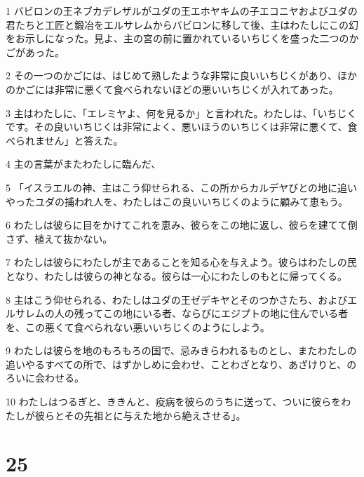 \par 1 バビロンの王ネブカデレザルがユダの王エホヤキムの子エコニヤおよびユダの君たちと工匠と鍛冶をエルサレムからバビロンに移して後、主はわたしにこの幻をお示しになった。見よ、主の宮の前に置かれているいちじくを盛った二つのかごがあった。
\par 2 その一つのかごには、はじめて熟したような非常に良いいちじくがあり、ほかのかごには非常に悪くて食べられないほどの悪いいちじくが入れてあった。
\par 3 主はわたしに、「エレミヤよ、何を見るか」と言われた。わたしは、「いちじくです。その良いいちじくは非常によく、悪いほうのいちじくは非常に悪くて、食べられません」と答えた。
\par 4 主の言葉がまたわたしに臨んだ、
\par 5 「イスラエルの神、主はこう仰せられる、この所からカルデヤびとの地に追いやったユダの捕われ人を、わたしはこの良いいちじくのように顧みて恵もう。
\par 6 わたしは彼らに目をかけてこれを恵み、彼らをこの地に返し、彼らを建てて倒さず、植えて抜かない。
\par 7 わたしは彼らにわたしが主であることを知る心を与えよう。彼らはわたしの民となり、わたしは彼らの神となる。彼らは一心にわたしのもとに帰ってくる。
\par 8 主はこう仰せられる、わたしはユダの王ゼデキヤとそのつかさたち、およびエルサレムの人の残ってこの地にいる者、ならびにエジプトの地に住んでいる者を、この悪くて食べられない悪いいちじくのようにしよう。
\par 9 わたしは彼らを地のもろもろの国で、忌みきらわれるものとし、またわたしの追いやるすべての所で、はずかしめに会わせ、ことわざとなり、あざけりと、のろいに会わせる。
\par 10 わたしはつるぎと、ききんと、疫病を彼らのうちに送って、ついに彼らをわたしが彼らとその先祖とに与えた地から絶えさせる」。

\chapter{25}

